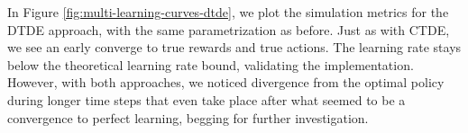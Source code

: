 In Figure \ref{fig:multi-learning-curves-dtde}, we plot the simulation metrics for the DTDE approach, with the same parametrization as before. Just as with CTDE, we see an early converge to true rewards and true actions. The learning rate stays below the theoretical learning rate bound, validating the implementation. However, with both approaches, we noticed divergence from the optimal policy during longer time steps that even take place after what seemed to be a convergence to perfect learning, begging for further investigation. 
\pagebreak 
